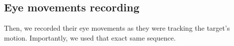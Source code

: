 \documentclass[profile,final,english,draft]{article}%
\begin{document}

\subsection{Eye movements recording}

%
%
%
Then, we recorded their eye movements as they were tracking the target's motion. Importantly, we used that exact same sequence.
\end{document}
